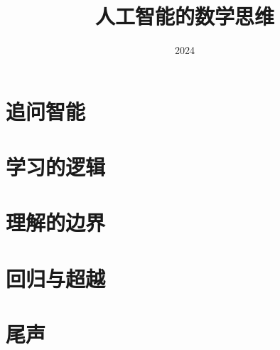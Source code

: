 \documentclass[lang=cn,scheme=chinese,12pt]{elegantbook}
\title{人工智能的数学思维}
\institute{华东师范大学 软件工程学院}
\date{2024}
\begin{document}
\maketitle

%

\frontmatter

\tableofcontents

\mainmatter

%
\part{追问智能}

\part{学习的逻辑}
%


\part{理解的边界}




\part{回归与超越}


%

\part{尾声}


%


\end{document}
